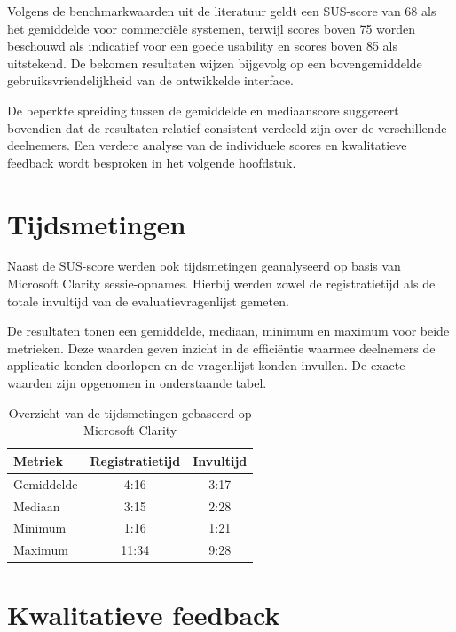 Volgens de benchmarkwaarden uit de literatuur geldt een SUS-score van 68 als het gemiddelde voor commerciële systemen, terwijl scores boven 75 worden beschouwd als indicatief voor een goede usability en scores boven 85 als uitstekend. 
De bekomen resultaten wijzen bijgevolg op een bovengemiddelde gebruiksvriendelijkheid van de ontwikkelde interface.
\medskip

De beperkte spreiding tussen de gemiddelde en mediaanscore suggereert bovendien dat de resultaten relatief consistent verdeeld zijn over de verschillende deelnemers. 
Een verdere analyse van de individuele scores en kwalitatieve feedback wordt besproken in het volgende hoofdstuk.

\section{Tijdsmetingen}
\label{sec:tijdsmetingen}

Naast de SUS-score werden ook tijdsmetingen geanalyseerd op basis van Microsoft Clarity sessie-opnames. 
Hierbij werden zowel de registratietijd als de totale invultijd van de evaluatievragenlijst gemeten.
\medskip

De resultaten tonen een gemiddelde, mediaan, minimum en maximum voor beide metrieken. 
Deze waarden geven inzicht in de efficiëntie waarmee deelnemers de applicatie konden doorlopen en de vragenlijst konden invullen. 
De exacte waarden zijn opgenomen in onderstaande tabel.

\begin{table}[H]
    \centering
        \begin{tabular}{|l|c|c|}
            \hline
            \textbf{Metriek} & \textbf{Registratietijd} & \textbf{Invultijd} \\
            \hline
            Gemiddelde & 4:16 & 3:17 \\
            Mediaan & 3:15 & 2:28 \\
            Minimum & 1:16 & 1:21 \\
            Maximum & 11:34 & 9:28 \\
            \hline
        \end{tabular}
    \caption{Overzicht van de tijdsmetingen gebaseerd op Microsoft Clarity}
    \label{tab:tijdsmetingen}
\end{table}

\section{Kwalitatieve feedback}
\label{sec:kwalitatievefeedback}

